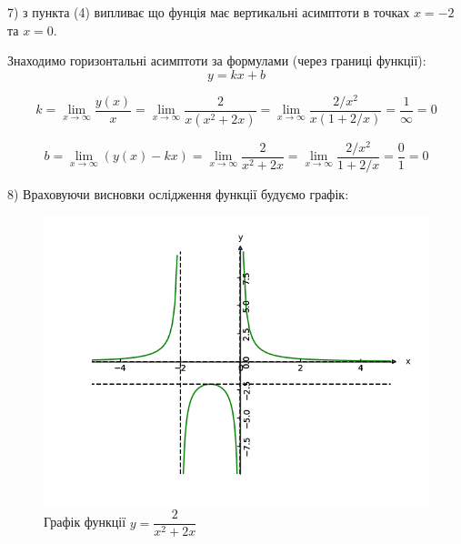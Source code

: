 7) з пункта (4) випливає що фунція має вертикальні асимптоти в точках $x=-2$ та $x=0$.

Знаходимо горизонтальні асимптоти за формулами (через границі функції):
$$
  y = kx+b
$$

$$
  k = \lim_{x\to\infty} \dfrac{y(x)}{x}
    = \lim_{x\to\infty} \dfrac{2}{x(x^2+2x)}
    = \lim_{x\to\infty} \dfrac{2/x^2}{x(1+2/x)}
    = \dfrac{1}{\infty}
    = 0
$$

$$
  b = \lim_{x\to\infty} (y(x) - kx)
    = \lim_{x\to\infty} \dfrac{2}{x^2+2x}
    = \lim_{x\to\infty} \dfrac{2/x^2}{1+2/x}
    = \dfrac{0}{1}
    = 0
$$

8) Враховуючи висновки ослідження функції будуємо графік:

\begin{figure}[h!]
  \centering
  \includegraphics[width=14cm]{rozrahunkova_01/07_01.png}
  \caption{Графік функції $y=\dfrac{2}{x^2+2x}$ }
  \label{fig:rr_01_07_01}
  \centering
\end{figure}
